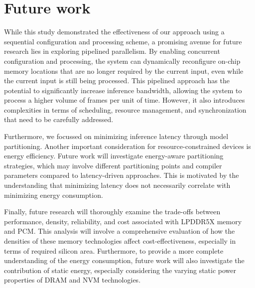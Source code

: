 \section{Future work}
While this study demonstrated the effectiveness of our approach using a sequential configuration and processing scheme, a promising avenue for future research lies in exploring pipelined parallelism.
By enabling concurrent configuration and processing, the system can dynamically reconfigure on-chip memory locations that are no longer required by the current input, even while the current input is still being processed.
This pipelined approach has the potential to significantly increase inference bandwidth, allowing the system to process a higher volume of frames per unit of time.
However, it also introduces complexities in terms of scheduling, resource management, and synchronization that need to be carefully addressed.

Furthermore, we focussed on minimizing inference latency through model partitioning.
Another important consideration for resource-constrained devices is energy efficiency.
Future work will investigate energy-aware partitioning strategies, which may involve different partitioning points and compiler parameters compared to latency-driven approaches.
This is motivated by the understanding that minimizing latency does not necessarily correlate with minimizing energy consumption.

Finally, future research will thoroughly examine the trade-offs between performance, density, reliability, and cost associated with LPDDR5X memory and PCM.
This analysis will involve a comprehensive evaluation of how the densities of these memory technologies affect cost-effectiveness, especially in terms of required silicon area.
Furthermore, to provide a more complete understanding of the energy consumption, future work will also investigate the contribution of static energy, especially considering the varying static power properties of DRAM and NVM technologies.
